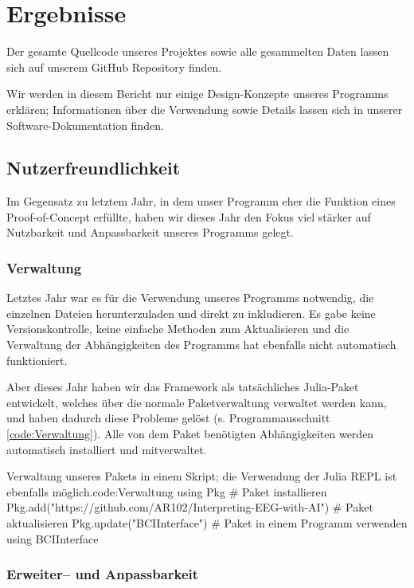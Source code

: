 \documentclass[10pt]{article}
\newcommand{\coderef}[1]{Programmausschnitt \ref{#1}}
\begin{document}
\section{Ergebnisse}

Der gesamte Quellcode unseres Projektes sowie alle gesammelten Daten lassen sich auf unserem GitHub Repository \cite{InterpretingEEG} finden.

Wir werden in diesem Bericht nur einige Design-Konzepte unseres Programms erklären; Informationen über die Verwendung sowie Details lassen sich in unserer Software-Dokumentation \cite{BCIInterfaceDocs} finden. 

\subsection{Nutzerfreundlichkeit}

Im Gegensatz zu letztem Jahr, in dem unser Programm eher die Funktion eines Proof-of-Concept erfüllte, haben wir dieses Jahr den Fokus viel stärker auf Nutzbarkeit und Anpassbarkeit unseres Programms gelegt.

\subsubsection{Verwaltung}

Letztes Jahr war es für die Verwendung unseres Programms notwendig, die einzelnen Dateien herunterzuladen und direkt zu inkludieren.
Es gabe keine Versionskontrolle, keine einfache Methoden zum Aktualisieren und die Verwaltung der Abhängigkeiten des Programms hat ebenfalls nicht automatisch funktioniert.

Aber dieses Jahr haben wir das Framework als tatsächliches Julia-Paket entwickelt, welches über die normale Paketverwaltung verwaltet werden kann, und haben dadurch diese Probleme gelöst (s. \coderef{code:Verwaltung}).
Alle von dem Paket benötigten Abhängigkeiten werden automatisch installiert und mitverwaltet.

\begin{code}[0.75]{Verwaltung unseres Pakets in einem Skript; die Verwendung der Julia REPL ist ebenfalls möglich.}{code:Verwaltung}
    using Pkg
    # Paket installieren
    Pkg.add("https://github.com/AR102/Interpreting-EEG-with-AI")
    # Paket aktualisieren
    Pkg.update("BCIInterface")
    # Paket in einem Programm verwenden
    using BCIInterface
\end{code}

\subsubsection{Erweiter-- und Anpassbarkeit}
\end{document}
